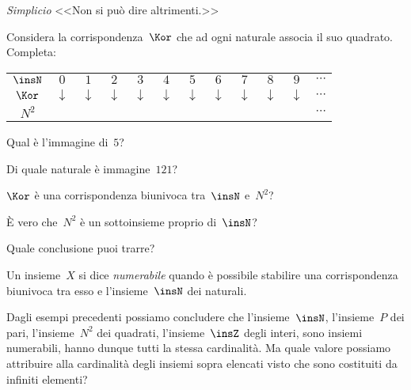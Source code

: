 \begin{exrig}
\begin{esempio}
\emph{Simplicio} <<Non si può dire altrimenti.>>

Considera la corrispondenza~$\Kor$ che ad ogni naturale associa il suo quadrato.
Completa:
\begin{center}
 \begin{tabular}{cccccccccccc}
  \toprule
  $\insN$ & $0$ & $1$ & $2$ & $3$ & $4$ & $5$ & $6$ & $7$ & $8$ & $9$ & $\cdots$\\
  $\Kor$  & $\downarrow$ & $\downarrow$ & $\downarrow$ & $\downarrow$ & $\downarrow$ & $\downarrow$ & $\downarrow$ & $\downarrow$ & $\downarrow$ &$\downarrow$ & $\cdots$\\
  $N^2$ & & & & & & & & & & & $\cdots$\\
  \bottomrule
 \end{tabular}
\end{center}
\begin{itemize*}
\item Qual è l'immagine di~$5$?
\item Di quale naturale è immagine~$121$?
\item $\Kor$ è una corrispondenza biunivoca tra~$\insN$ e~$N^2$?
\item \`E vero che~$N^2$ è un sottoinsieme proprio di~$\insN$?
\item Quale conclusione puoi trarre?
\end{itemize*}

 \end{esempio}
\end{exrig}

\begin{definizione}
 Un insieme~$X$ si dice \emph{numerabile} quando è possibile stabilire una corrispondenza biunivoca tra esso e l'insieme~$\insN$ dei naturali.
\end{definizione}

Dagli esempi precedenti possiamo concludere che l'insieme~$\insN$, l'insieme~$P$ dei pari, l'insieme~$N^2$
dei quadrati, l'insieme~$\insZ$ degli interi, sono insiemi numerabili, hanno dunque tutti la stessa cardinalità.
Ma quale valore possiamo attribuire alla cardinalità degli insiemi sopra elencati visto che sono costituiti da infiniti elementi?

